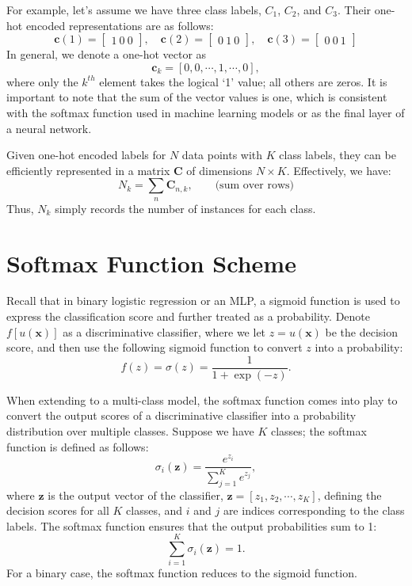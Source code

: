 \documentclass[12pt]{article}
\begin{document}
For example, let's assume we have three class labels, \(C_1\), \(C_2\), and \(C_3\). Their one-hot encoded representations are as follows:
\begin{equation}
\mathbf{c}(1) = \begin{bmatrix}1 \ 0 \ 0\end{bmatrix}, \quad
\mathbf{c}(2) = \begin{bmatrix}0 \ 1 \ 0\end{bmatrix}, \quad
\mathbf{c}(3) = \begin{bmatrix}0 \ 0 \ 1\end{bmatrix}
\end{equation}
In general, we denote a one-hot vector as
\begin{equation}
\mathbf{c}_k = [0, 0, \cdots, 1, \cdots, 0],
\end{equation}
where only the \(k^{th}\) element takes the logical `1' value; all others are zeros. It is important to note that the sum of the vector values is one, which is consistent with the softmax function used in machine learning models or as the final layer of a neural network.

Given one-hot encoded labels for \(N\) data points with \(K\) class labels, they can be efficiently represented in a matrix \(\mathbf{C}\) of dimensions \(N \times K\). Effectively, we have:
\[
N_k = \sum_{n} \mathbf{C}_{n,k}, \qquad \text{(sum over rows)}
\]
Thus, \(N_k\) simply records the number of instances for each class.

\section{Softmax Function Scheme}
Recall that in binary logistic regression or an MLP, a sigmoid function is used to express the classification score and further treated as a probability. Denote \(f[u(\bm{x})]\) as a discriminative classifier, where we let \(z = u(\bm{x})\) be the decision score, and then use the following sigmoid function to convert \(z\) into a probability:
\[
f(z) = \sigma(z) = \frac{1}{1+\exp(-z)}.
\]

When extending to a multi-class model, the softmax function comes into play to convert the output scores of a discriminative classifier into a probability distribution over multiple classes. Suppose we have \(K\) classes; the softmax function is defined as follows:
\begin{equation}
\sigma_i(\bm{z}) = \frac{e^{z_i}}{\sum_{j=1}^K e^{z_j}},
\end{equation}
where \(\bm{z}\) is the output vector of the classifier, \(\bm{z} = [z_1, z_2, \cdots, z_K]\), defining the decision scores for all \(K\) classes, and \(i\) and \(j\) are indices corresponding to the class labels. The softmax function ensures that the output probabilities sum to 1:
\[
\sum_{i=1}^K \sigma_i(\bm{z}) = 1.
\]
For a binary case, the softmax function reduces to the sigmoid function.
\end{document}
